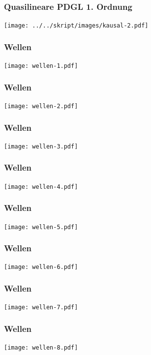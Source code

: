 \documentclass[handout]{beamer}
\begin{document}
\begin{frame}
\frametitle{Quasilineare PDGL 1. Ordnung}
\begin{center}
\texttt{[image: ../../skript/images/kausal-2.pdf]}
\end{center}
\end{frame}

\begin{frame}
\frametitle{Wellen}
\begin{center}
\texttt{[image: wellen-1.pdf]}
\end{center}
\end{frame}

\begin{frame}
\frametitle{Wellen}
\begin{center}
\texttt{[image: wellen-2.pdf]}
\end{center}
\end{frame}

\begin{frame}
\frametitle{Wellen}
\begin{center}
\texttt{[image: wellen-3.pdf]}
\end{center}
\end{frame}

\begin{frame}
\frametitle{Wellen}
\begin{center}
\texttt{[image: wellen-4.pdf]}
\end{center}
\end{frame}

\begin{frame}
\frametitle{Wellen}
\begin{center}
\texttt{[image: wellen-5.pdf]}
\end{center}
\end{frame}

\begin{frame}
\frametitle{Wellen}
\begin{center}
\texttt{[image: wellen-6.pdf]}
\end{center}
\end{frame}

\begin{frame}
\frametitle{Wellen}
\begin{center}
\texttt{[image: wellen-7.pdf]}
\end{center}
\end{frame}

\begin{frame}
\frametitle{Wellen}
\begin{center}
\texttt{[image: wellen-8.pdf]}
\end{center}
\end{frame}
\end{document}
